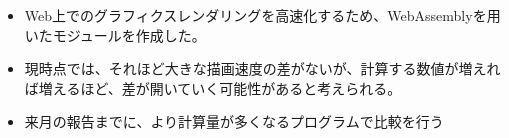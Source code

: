\newpage

\label{MUSUBI}
\begin{itemize}
	\item Web上でのグラフィクスレンダリングを高速化するため、WebAssemblyを用いたモジュールを作成した。
	\item 現時点では、それほど大きな描画速度の差がないが、計算する数値が増えれば増えるほど、差が開いていく可能性があると考えられる。
	\item 来月の報告までに、より計算量が多くなるプログラムで比較を行う
\end{itemize}
\newpage

\begin{thebibliography}{99}
\small
\setlength\itemsep{-0.5\zh}%
\end{thebibliography}

 
